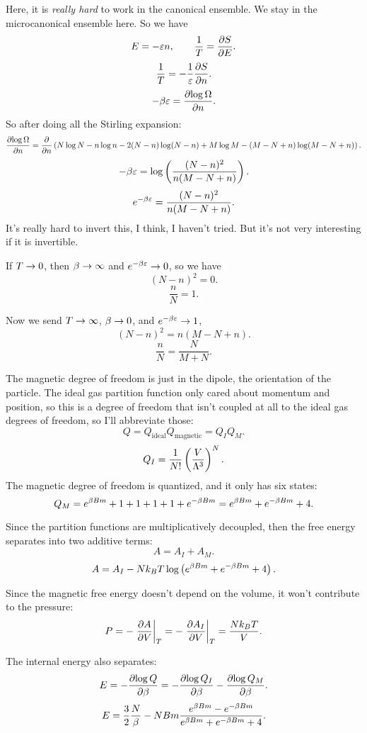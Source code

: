 \documentclass[12pt]{article}
\begin{document}
 Here, it is \emph{really hard} to work in the canonical ensemble. We stay in the microcanonical ensemble here. So we have
\[ E = -\varepsilon n,\qquad \frac{1}{T} = \frac{\partial {S}}{\partial {E}}.\]
\[ \frac{1}{T} = -\frac{1}{\varepsilon} \frac{\partial {S}}{\partial {n}}.\]
\[ -\beta \varepsilon = \frac{\partial {\log \Omega}}{\partial {n}}.\]
So after doing all the Stirling expansion:
\[ \frac{\partial {\log \Omega}}{\partial {n}} = \frac{\partial {}}{\partial {n}} \left( N\log N - n\log n - 2(N-n)\log(N-n) + M\log M  - (M-N+n)\log(M-N+n) \right).\]
\[ -\beta \varepsilon = \log \left( \frac{(N-n)^2}{n(M-N+n)} \right).\]
\[ e^{-\beta \varepsilon} = \frac{ (N-n)^2}{n(M-N+n)}.\]
It's really hard to invert this, I think, I haven't tried. But it's not very interesting if it is invertible.

 If $T\rightarrow 0$, then $\beta\rightarrow \infty$ and $e^{-\beta \varepsilon} \rightarrow 0$, so we have
\[ (N-n)^2 = 0.\]
\[ \frac{n}{N} = 1.\]

 Now we send $T\rightarrow \infty$, $\beta \rightarrow 0$, and $e^{-\beta \varepsilon} \rightarrow 1$,
\[ (N-n)^2 = n(M-N+n).\]
\[ \frac{n}{N} = \frac{N}{M+N}.\]

\hrulefill

 The magnetic degree of freedom is just in the dipole, the orientation of the particle. The ideal gas partition function only cared about momentum and position, so this is a degree of freedom that isn't coupled at all to the ideal gas degrees of freedom, so I'll abbreviate those:
\[ Q = Q_\mathrm{ideal} Q_\mathrm{magnetic} = Q_I Q_M.\]
\[ Q_I = \frac{1}{N!} \left(\frac{V}{\Lambda^3} \right)^N.\]
The magnetic degree of freedom is quantized, and it only has six states:
\[ Q_M = e^{\beta Bm} + 1 + 1 + 1 + 1 + e^{-\beta Bm} = e^{\beta Bm} + e^{-\beta Bm} + 4.\]

 Since the partition functions are multiplicatively decoupled, then the free energy separates into two additive terms:
\[ A = A_I + A_M.\]
\[ A = A_I - Nk_BT \log \left( e^{\beta Bm} + e^{-\beta Bm} + 4\right).\]

 Since the magnetic free energy doesn't depend on the volume, it won't contribute to the pressure:
\[ P = -\left.\frac{\partial{A}}{\partial{V}}\right|_{T} = -\left.\frac{\partial{A_I}}{\partial{V}}\right|_{T} = \frac{Nk_BT}{V}.\]

 The internal energy also separates:
\[ E = -\frac{\partial {\log Q}}{\partial {\beta}} = -\frac{\partial {\log Q_I}}{\partial {\beta}} - \frac{\partial {\log Q_M}}{\partial {\beta}}.\]
\[ E = \frac{3}{2}\frac{N}{\beta}  - NBm \frac{e^{\beta Bm} - e^{-\beta Bm}}{e^{\beta Bm} + e^{-\beta Bm} + 4}.\]
\end{document}
